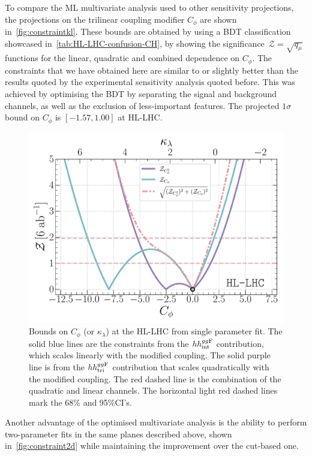 To compare the ML multivariate analysis used to other sensitivity projections, the projections on the trilinear coupling modifier $C_\phi$ are shown in~\autoref{fig:constraintkl}. These bounds are obtained by using a BDT classification showcased in~\autoref{tab:HL-LHC-confusion-CH}, by showing the significance~$\mathcal Z = \sqrt{q_\mu}$ functions for the linear, quadratic and combined dependence on $C_\phi$. The constraints that we have obtained here are similar to or slightly better than the results quoted by the experimental sensitivity analysis quoted before. This was achieved by optimising the BDT by separating the signal and background channels, as well as the exclusion of less-important features. The projected $1\sigma$ bound on $C_\phi$ is $[-1.57, 1.00]$ at HL-LHC. 
\begin{figure}[h!]
	\centering
	\includegraphics[width=0.55\linewidth]{fig/HL-LHC-sig14.pdf}
	\caption{ Bounds on $C_\phi$ (or $\kappa_\lambda$) at the HL-LHC from single parameter fit. The solid blue lines are the constraints from the $hh^{gg\rm F}_{\rm int}$ contribution, which scales linearly with the modified coupling. The solid purple line is from the $hh^{gg\rm F}_{\rm tri}$ contribution that scales quadratically with the modified coupling. The red dashed line is the combination of the quadratic and linear channels. The horizontal light red dashed lines mark the 68\% and 95\%CI's.}
	\label{fig:constraintkl}
\end{figure}
Another advantage of the optimised multivariate analysis is the ability to perform two-parameter fits in the same planes described above, shown in~\autoref{fig:constraint2d} while maintaining the improvement over the cut-based one. 

